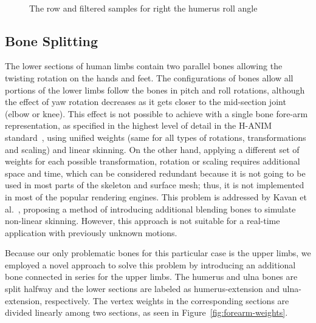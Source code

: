 \begin{figure}[htbp]
	\centerline{ 
	}
\centerline{\ }
\caption{The row and filtered samples for right the humerus roll angle}
	\label{fig:rotation-filter}
\end{figure}


\subsection {Bone Splitting}
The lower sections of human limbs contain two parallel bones allowing the twisting rotation on the hands and feet. The configurations of bones allow all portions of the lower limbs follow the bones in pitch and roll rotations, although the effect of yaw rotation decreases as it gets closer to the mid-section joint (elbow or knee). This effect is not possible to achieve with a single bone fore-arm representation, as specified in the highest level of detail in the H-ANIM standard~\cite{HANIM}, using unified weights (same for all types of rotations, transformations and scaling) and linear skinning. On the other hand, applying a different set of weights for each possible transformation, rotation or scaling requires additional space and time, which can be considered redundant because it is not going to be used in most parts of the skeleton and surface mesh; thus, it is not implemented in most of the popular rendering engines. This problem is addressed by Kavan et al.~\cite{Kavan2009}, proposing a method of introducing additional blending bones to simulate non-linear skinning. However, this approach is not suitable for a real-time application with previously unknown motions. 

Because our only problematic bones for this particular case is the upper limbs, we employed a novel approach to solve this problem by introducing an additional bone connected in series for the upper limbs. The humerus and ulna bones are split halfway and the lower sections are labeled as humerus-extension and ulna-extension, respectively. The vertex weights in the corresponding sections are divided linearly among two sections, as seen in Figure~\ref{fig:forearm-weights}. 


